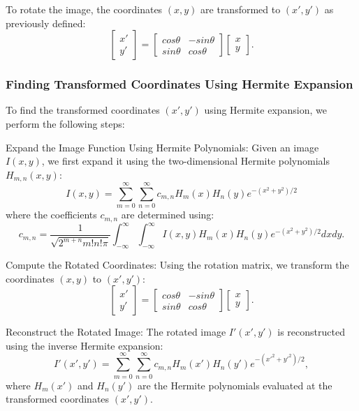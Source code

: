 \documentclass[conference]{IEEEtran}
\begin{document}
To rotate the image, the coordinates $(x,y)$ are transformed to $(x', y')$ as previously defined:
$$
\begin{bmatrix}
x' \\
y'
\end{bmatrix}
=
\begin{bmatrix}
cos \theta & -sin \theta \\
sin \theta & cos \theta
\end{bmatrix}
\begin{bmatrix}
x \\
y
\end{bmatrix}.
$$

\subsubsection{Finding Transformed Coordinates Using Hermite Expansion}

To find the transformed coordinates $(x', y')$ using Hermite expansion, we perform the following steps:

Expand the Image Function Using Hermite Polynomials:
    Given an image $I(x,y)$, we first expand it using the two-dimensional Hermite polynomials $H_{m,n}(x,y)$:
    $$
    I(x,y) = \sum_{m=0}^{\infty} \sum_{n=0}^{\infty} c_{m,n} H_m(x) H_n(y) e^{-(x^2 + y^2)/2}
    $$
    where the coefficients $c_{m,n}$ are determined using:
    $$
    c_{m,n} = \frac{1}{\sqrt{2^{m+n} m! n! \pi}} \int_{-\infty}^{\infty} \int_{-\infty}^{\infty} I(x,y) H_m(x) H_n(y) e^{-(x^2 + y^2)/2} dx dy.
    $$

Compute the Rotated Coordinates:
   Using the rotation matrix, we transform the coordinates $(x,y)$ to $(x',y')$:
   $$
   \begin{bmatrix}
   x' \\
   y'
   \end{bmatrix}
   =
   \begin{bmatrix}
   cos \theta & -sin \theta \\
   sin \theta & cos \theta
   \end{bmatrix}
   \begin{bmatrix}
   x \\
   y
   \end{bmatrix}.
   $$

Reconstruct the Rotated Image:
   The rotated image $I'(x',y')$ is reconstructed using the inverse Hermite expansion:
   $$
   I'(x',y') = \sum_{m=0}^{\infty} \sum_{n=0}^{\infty} c_{m,n} H_m(x') H_n(y') e^{-(x'^2 + y'^2)/2},
   $$
   where $H_m(x')$ and $H_n(y')$ are the Hermite polynomials evaluated at the transformed coordinates $(x', y')$.
\end{document}
